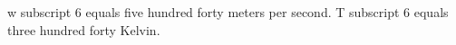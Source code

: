 w subscript 6 equals five hundred forty meters per second.  
T subscript 6 equals three hundred forty Kelvin.